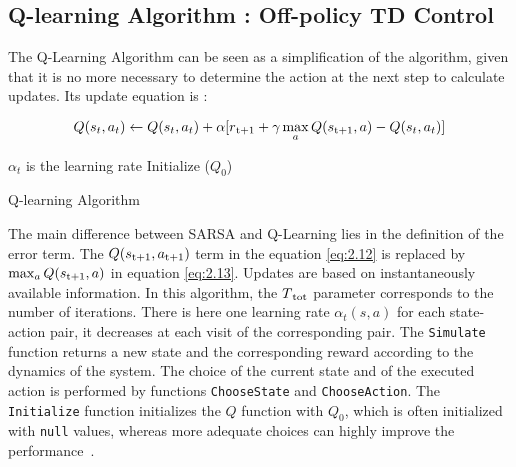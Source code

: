 \subsection{Q-learning Algorithm : Off-policy TD Control} The Q-Learning Algorithm can be seen as a simplification of the  algorithm, given that it is no more necessary to determine the action at the next step to calculate updates. Its update equation is :

\begin{equation}
\label{eq:2.13}
	Q(s_t, a_t) \leftarrow Q(s_t, a_t) + \alpha[r\textsubscript{t+1} + \gamma \max_{a} Q(s\textsubscript{t+1}, a) - Q(s_t, a_t)]
\end{equation} 

\begin{algorithm}
	$\alpha_t$ is the learning rate \;
	Initialize ($Q_0$)\;
\caption{Q-learning Algorithm ~\cite{Sigaud:2010:MDP:1841781}}
\end{algorithm}

The main difference between SARSA and Q-Learning lies in the definition of the error term. The $Q(s\textsubscript{t+1}, a\textsubscript{t+1})$ term in the equation \ref{eq:2.12}	is replaced by $\max_{a}Q(s\textsubscript{t+1}, a)$ in equation \ref{eq:2.13}. Updates are based on instantaneously available information. In this algorithm, the $T\textsubscript{tot}$ parameter corresponds to the number of iterations. There is here one learning rate $\alpha_t(s, a)$ for each state-action pair, it decreases at each visit of the corresponding  pair. The {\tt Simulate} function returns a new state and the corresponding reward according to the dynamics of the system. The choice of the current state and of the executed action is performed by functions {\tt ChooseState} and {\tt ChooseAction}. The {\tt Initialize} function initializes the $Q$ function with $Q_0$, which is often initialized with {\tt null} values, whereas more adequate choices can highly improve the performance~\cite{Sigaud:2010:MDP:1841781}.

